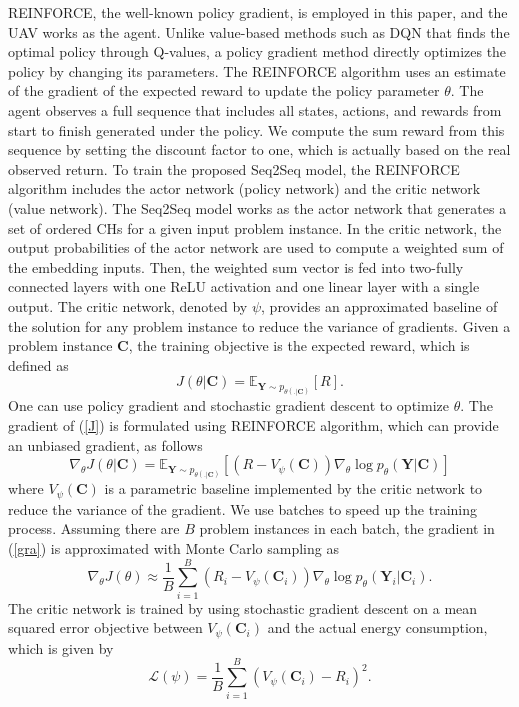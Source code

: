\documentclass[journal]{IEEEtran}
\begin{document}
	 {REINFORCE\cite{R. J. Williams}, the well-known policy gradient, is employed in this paper, and the UAV works as the agent. Unlike value-based methods such as DQN that finds the optimal policy through Q-values, a policy gradient method directly optimizes the policy by changing its parameters.
	 The REINFORCE algorithm uses an estimate of the gradient of the expected reward to update the policy parameter $\theta$. The agent observes a full sequence that includes all states, actions, and rewards from start to finish generated under the policy. We compute the sum reward from this sequence by setting the discount factor to one, which is actually based on the real observed return. To train the proposed Seq2Seq model, the REINFORCE algorithm includes the actor network (policy network) and the critic network (value network).} The Seq2Seq model works as the actor network that generates a set of ordered CHs for a given input problem instance. In the critic network, the output probabilities of the actor network are used to compute a weighted sum of the embedding inputs. Then, the weighted sum vector is fed into two-fully connected layers with one ReLU activation and one linear layer with a single output. The critic network, denoted by $\psi$, provides an approximated baseline of the solution for any problem instance to reduce the variance of gradients\cite{V. R. Konda}. Given a problem instance $\bm{C}$, the training objective is the expected reward, which is defined as
	\begin{equation}
	    \label{J}
	    J\left(\theta|\bm{C}\right) = \mathbb{E}_{\bm{Y}\sim p_{\theta(.|\bm{C})}} [R].
	\end{equation}
    One can use policy gradient and stochastic gradient descent to optimize $\theta$. The gradient of (\ref{J}) is formulated using REINFORCE algorithm,  which can provide an unbiased gradient, as follows
	\begin{equation}
	   \label{gra}
	    \nabla_{\theta}J\left(\theta|\bm{C}\right) = \mathbb{E}_{\bm{Y}\sim p_{\theta(.|\bm{C})}}\left[\left(R - V_{\psi}\left(\bm{C}\right)\right) \nabla_{\theta}\log p_{\theta}\left( \bm{Y} | \bm{C}\right) \right]
	\end{equation}
	where $V_{\psi}\left(\bm{C}\right)$ is a parametric baseline implemented by the critic network { to reduce the variance of the gradient}. { We use batches to speed up the training process. Assuming there are $B$ problem instances in each batch,} the gradient in (\ref{gra}) is approximated {with Monte Carlo sampling as}
	\begin{equation}
	    \nabla_{\theta}J\left(\theta\right) \approx \frac{1}{B} \sum_{i=1}^B \left( R_i-V_{\psi}\left(\bm{C}_i\right) \right) \nabla_{\theta} \log p_{\theta} \left(\bm{Y}_i|\bm{C}_i\right).
	\end{equation}
    The critic network is trained by using stochastic gradient descent on a mean squared error objective between $V_\psi \left(\bm{C}_i \right)$ and the actual energy consumption, which is given by
	\begin{equation}
	    \mathcal{L}(\psi)=\frac{1}{B}\sum_{i=1}^{B}\left(V_{\psi}\left(\bm{C}_i\right)-R_i \right)^2.
	\end{equation}
	
\end{document}
